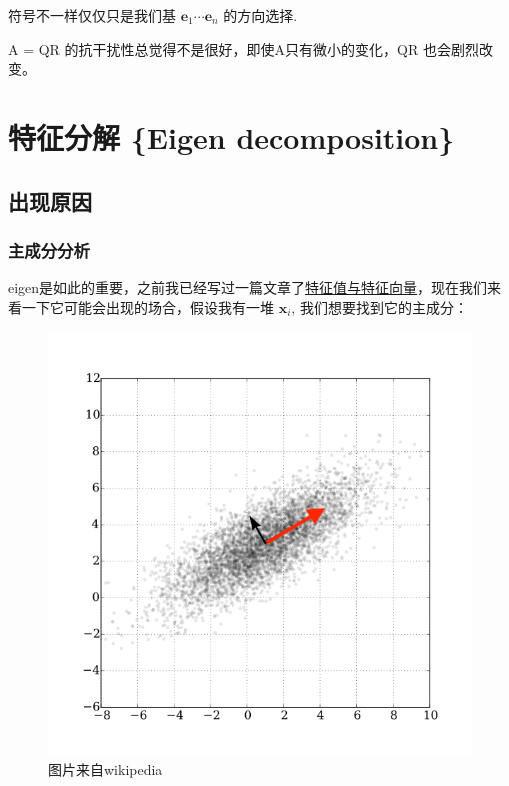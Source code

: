 \documentclass[
]{book}
\begin{document}
符号不一样仅仅只是我们基 \(\mathbf{e}_1\cdots \mathbf{e}_n\) 的方向选择.

A = QR 的抗干扰性总觉得不是很好，即使A只有微小的变化，QR 也会剧烈改变。

\hypertarget{ux7279ux5f81ux5206ux89e3-eigen-decomposition}{%
\chapter{特征分解 \{Eigen decomposition\}}\label{ux7279ux5f81ux5206ux89e3-eigen-decomposition}}

\hypertarget{ux51faux73b0ux539fux56e0}{%
\section{出现原因}\label{ux51faux73b0ux539fux56e0}}

\hypertarget{ux4e3bux6210ux5206ux5206ux6790}{%
\subsection{主成分分析}\label{ux4e3bux6210ux5206ux5206ux6790}}

eigen是如此的重要，之前我已经写过一篇文章了\href{https://zhuanlan.zhihu.com/p/95836870}{特征值与特征向量}，现在我们来看一下它可能会出现的场合，假设我有一堆 \(\mathbf{x}_i\), 我们想要找到它的主成分：

\begin{figure}
\centering
\includegraphics{images/GaussianScatterPCA.png}
\caption{图片来自wikipedia}
\end{figure}
\end{document}
